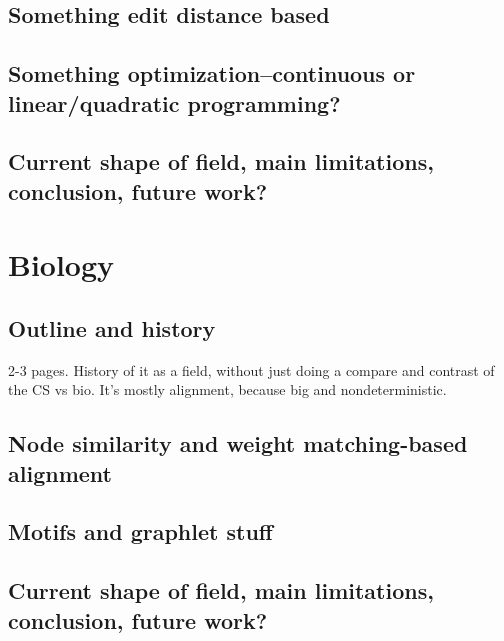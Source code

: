 \documentclass[12pt]{thesis}
\theoremstyle{plain}
\theoremstyle{definition}
\theoremstyle{remark}
\begin{document}
\section{Something edit distance based}

\section{Something optimization--continuous or linear/quadratic programming?}

\section{Current shape of field, main limitations, conclusion, future work?}
















\chapter{Biology}
 







\section{Outline and history}

2-3 pages. History of it as a field, without just doing a compare and contrast of the CS vs bio. It's mostly alignment, because big and nondeterministic.

\section{Node similarity and weight matching-based alignment}

\section{Motifs and graphlet stuff}

\section{Current shape of field, main limitations, conclusion, future work?}
\end{document}
